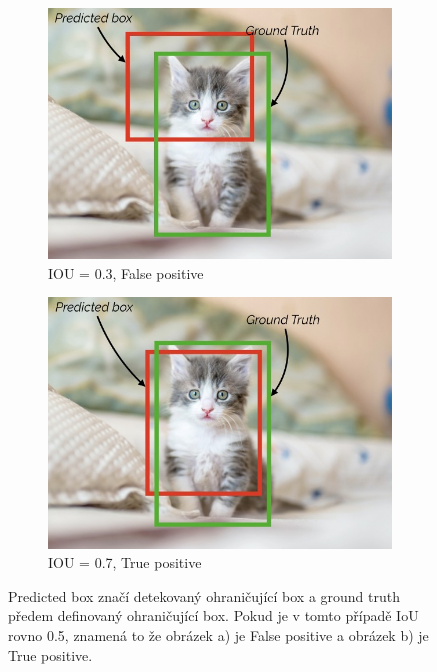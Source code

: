 \pagebreak
\begin{figure}[h]\centering
    \centering
    \begin{subfigure}{0.45\textwidth}
    \includegraphics[width=0.9\linewidth]{obrazky-figures/iou1.png}\hfill
    \caption{IOU = 0.3, False positive}
    \end{subfigure}
    \begin{subfigure}{0.45\textwidth}
    \includegraphics[width=0.9\linewidth]{obrazky-figures/iou2.png}\hfill
    \caption{IOU = 0.7, True positive}
    \end{subfigure}
    \caption{Predicted box značí detekovaný ohraničující box a ground truth předem definovaný ohraničující box. Pokud je v tomto případě IoU rovno 0.5, znamená to že obrázek a) je False positive a obrázek b) je True positive\protect\footnotemark{}.}
    \label{iou2}
\end{figure}
